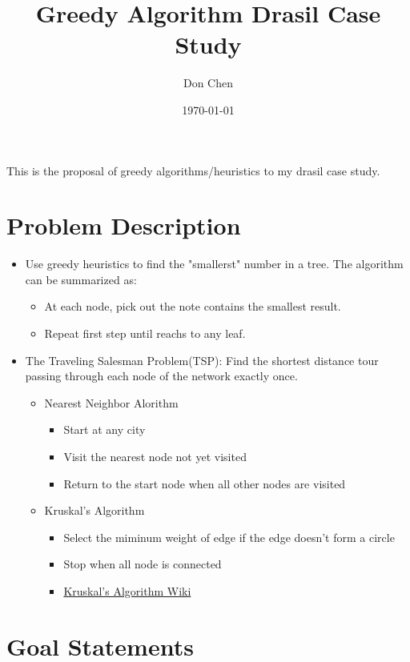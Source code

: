 \documentclass[12pt]{article}
\title{Greedy Algorithm Drasil Case Study}
\author{Don Chen}
\date{\today}
\begin{document}
\maketitle
This is the proposal of greedy algorithms/heuristics to my drasil case study.

\section{Problem Description}
\begin{itemize}
    \item Use greedy heuristics to find the "smallerst" number in a tree. 
    The algorithm can be summarized as:
    \begin{itemize}
        \item At each node, pick out the note contains the smallest result.
        \item Repeat first step until reachs to any leaf.
    \end{itemize}
    \item The Traveling Salesman Problem(TSP): 
    Find the shortest distance tour passing through each node of the network exactly once. 
    \begin{itemize}
        \item Nearest Neighbor Alorithm
        \begin{itemize}
            \item Start at any city
            \item Visit the nearest node not yet visited
            \item Return to the start node when all other nodes are visited
        \end{itemize}
        \item Kruskal’s Algorithm
        \begin{itemize}
            \item Select the miminum weight of edge if the edge doesn't form a circle
            \item Stop when all node is connected
            \item \href{https://en.wikipedia.org/wiki/Kruskal%27s_algorithm}{Kruskal’s Algorithm Wiki}
        \end{itemize}
    \end{itemize}
\end{itemize}

\section{Goal Statements}
\end{document}
